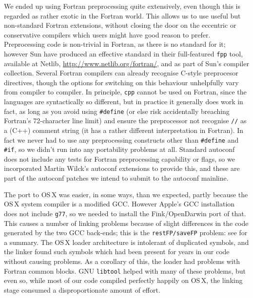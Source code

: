 \documentclass{speauth}
\begin{document}
We ended up using Fortran preprocessing quite extensively, even though
this is regarded as rather exotic in the Fortran world.  This allows
us to use useful but non-standard Fortran extensions, without closing
the door on the eccentric or conservative compilers which users might
have good reason to prefer.  Preprocessing code is non-trivial in
Fortran, as there is no standard for it; however Sun have produced an
effective standard in their full-featured \texttt{fpp} tool, available
at Netlib, \url{http://www.netlib.org/fortran/}, and as part of Sun's
compiler collection.  Several Fortran compilers can already recognise
C-style preprocesor directives, though the options for switching on
this behaviour unhelpfully vary from compiler to compiler.  In
principle, \texttt{cpp} cannot be used on Fortran, since the languages
are syntactically so different, but in practice it generally does work
in fact, as long as you avoid using \texttt{\#define} (or else risk
accidentally breaching Fortran's 72-character line limit) and ensure
the preprocessor not recognise \texttt{//} as a (C++) comment string
(it has a rather different interpretation in Fortran).  In fact we
never had to use any preprocessing constructs other than
\texttt{\#define} and \texttt{\#if}, so we didn't run into any
portability problems at all.  Standard autoconf does not include any
tests for Fortran preprocessing capability or flags, so we
incorporated Martin Wilck's autoconf extensions to provide this, and
these are part of the autoconf patches we intend to submit to the
autoconf mainline.

The port to OS\,X was easier, in some ways, than we expected, partly
because the OS\,X system compiler is a modified GCC.  However Apple's
GCC installation does not include \texttt{g77}, so we needed to
install the Fink/OpenDarwin port of that.  This causes a number of
linking problems because of slight differences in the code generated
by the two GCC back-ends; this is the \texttt{restFP/saveFP} problem:
see \cite{gray04} for a summary.  The OS\,X loader architecture is
intolerant of duplicated symbols, and the linker found such symbols
which had been present for years in our code without causing problems.
As a corollary of this, the loader had problems with Fortran common
blocks.  GNU \texttt{libtool} helped with many of these problems, but
even so, while most of our code compiled perfectly happily on OS\,X,
the linking stage consumed a disproportionate amount of effort.
\end{document}
